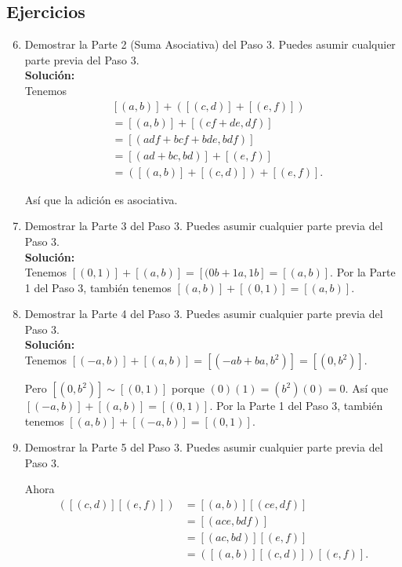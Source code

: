 \subsection*{Ejercicios}
\begin{enumerate}
	\setcounter{enumi}{5}
	\item Demostrar la Parte 2 (Suma Asociativa) del Paso 3. Puedes asumir cualquier parte previa del Paso 3. 
	\\ \textbf{Solución:} \\
	Tenemos
	\begin{align*}
		& [(a, b)] + ([(c, d)] + [(e, f)])\\ &= [(a, b)] +[(cf + de, df)] \\
		&= [(adf + bcf + bde, bdf )] \\
		&= [(ad + bc, bd)] +[(e, f)] \\
		&= ([(a, b)] + [(c, d)]) + [(e, f )].
	\end{align*}
	
	Así que la adición es asociativa.
	
	\item Demostrar la Parte 3 del Paso 3. Puedes asumir cualquier parte previa del Paso 3.
	\\ \textbf{Solución:} \\
	Tenemos \( [(0,1)]+[(a, b)] =[(0b+1a, 1b] =[(a, b)] \). Por la Parte 1 del Paso 3, también tenemos \( [(a, b)]+[(0,1)] = [(a, b)] \).
	
	\item Demostrar la Parte 4 del Paso 3. Puedes asumir cualquier parte previa del Paso 3.
	\\ \textbf{Solución:} \\
	Tenemos 
	$[(-a, b)] + [(a, b)] = [(-ab + ba, b^{2})] = [(0, b^{2})]. $
	
	Pero \( [(0, b^2)] \sim [(0, 1)] \) porque \( (0)(1) = (b^2)(0) = 0 \).
	Así que 
	\( [(-a, b)] + [(a, b)] = [(0, 1)] \).
	Por la Parte 1 del
	Paso 3, también tenemos \( [(a, b)] + [(-a, b)] = [(0, 1)] \).
	
	\item Demostrar la Parte 5 del Paso 3. Puedes asumir cualquier parte previa del Paso 3.
	
	Ahora
	\begin{align*}
		[(a, b)]([(c, d)][(e, f )]) &= [(a, b)][(ce, df )] \\
		&= [(ace, bdf )] \\
		&= [(ac, bd)][(e, f )]\\
		& = ([(a, b)][(c, d)])[(e, f )].
	\end{align*}
	

\end{enumerate}
